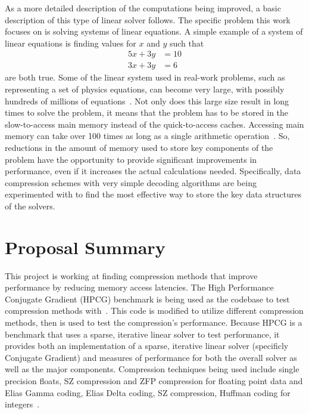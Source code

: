 \documentclass[titlepage]{article}
\begin{document}
As a more detailed description of the computations being improved, a basic description of
this type of linear solver follows.
The specific problem this work focuses on is solving systems of linear equations.
A simple example of a system of linear equations is finding values for \(x\) and \(y\) such that
\begin{align*}
	5x + 3y &= 10\\
	3x + 3y &= 6
\end{align*}
are both true.
Some of the linear system used in real-work problems, such as representing a set of physics equations,
can become very large, with possibly hundreds of millions of equations~\cite{Davis:2011:FloridaMatrixCollection}.
Not only does this large size result in long times to solve the problem,
it means that the problem has to be stored in the slow-to-access main memory instead of the quick-to-access caches.
Accessing main memory can take over 100 times as long as a single arithmetic operation~\cite{Goumas:2009:performanceEval}.
So, reductions in the amount of memory used to store key components of the problem
have the opportunity to provide significant improvements in performance, even if it increases the actual calculations needed.
Specifically, data compression schemes with very simple decoding algorithms are being experimented with
to find the most effective way to store the key data structures of the solvers.


\section{Proposal Summary}

This project is working at finding compression methods that improve performance by reducing memory access latencies.
The High Performance Conjugate Gradient (HPCG) benchmark is being used as the codebase to test compression methods with~\cite{Dongarra:2015:HPCG}.
This code is modified to utilize different compression methods, then is used to test the compression's performance.
Because HPCG is a benchmark that uses a sparse, iterative linear solver to test performance,
it provides both an implementation of a sparse, iterative linear solver (specificly Conjugate Gradient)
and measures of performance for both the overall solver as well as the major components.
Compression techniques being used include single precision floats, SZ compression and ZFP compression for floating point data
and Elias Gamma coding, Elias Delta coding, SZ compression, Huffman coding for integers~\cite{Di:2016:SZ,Lindstrom:2014:zfp,Elias:1975:codeword,Huffman:1952:coding}.
\end{document}
